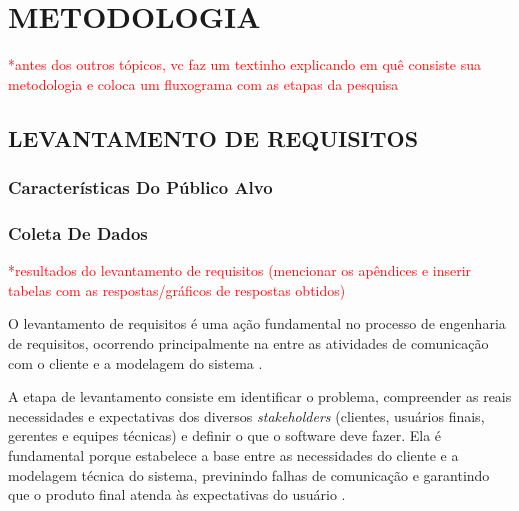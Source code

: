 \chapter{METODOLOGIA}
\label{cha:metodologia}

\textcolor{red}{*antes dos outros tópicos, vc faz um textinho explicando em quê consiste sua metodologia e coloca um fluxograma com as etapas da pesquisa}





\section{LEVANTAMENTO DE REQUISITOS} \label{sec:levantamento_requisitos}

\subsection{Características Do Público Alvo}

\subsection{Coleta De Dados}

\textcolor{red}{*resultados do levantamento de requisitos (mencionar os apêndices e inserir tabelas com as respostas/gráficos de respostas obtidos)}


O levantamento de requisitos é uma ação fundamental no processo de engenharia de requisitos, ocorrendo principalmente na entre as atividades de comunicação com o cliente e a modelagem do sistema \cite{pressman2011}. 

A etapa de levantamento consiste em identificar o problema, compreender as reais necessidades e expectativas dos diversos \textit{stakeholders} (clientes, usuários finais, gerentes e equipes técnicas) e definir o que o software deve fazer. Ela é fundamental porque estabelece a base entre as necessidades do cliente e a modelagem técnica do sistema, previnindo falhas de comunicação e garantindo que o produto final atenda às expectativas do usuário \cite{pressman2011}.

